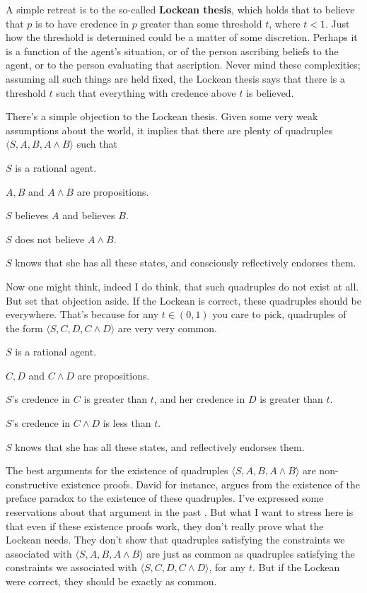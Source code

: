 A simple retreat is to the so-called \textbf{Lockean thesis}, which holds that to believe that $p$ is to have credence in $p$ greater than some threshold $t$, where $t < 1$. Just how the threshold is determined could be a matter of some discretion. Perhaps it is a function of the agent's situation, or of the person ascribing beliefs to the agent, or to the person evaluating that ascription. Never mind these complexities; assuming all such things are held fixed, the Lockean thesis says that there is a threshold $t$ such that everything with credence above $t$ is believed.

There's a simple objection to the Lockean thesis. Given some very weak assumptions about the world, it implies that there are plenty of quadruples $\langle S, A, B, A \wedge B \rangle$ such that

\begin{itemize*}
\item $S$ is a rational agent.
\item $A, B$ and $A \wedge B$ are propositions.
\item $S$ believes $A$ and believes $B$.
\item $S$ does not believe $A \wedge B$.
\item $S$ knows that she has all these states, and consciously reflectively endorses them.
\end{itemize*}

\noindent Now one might think, indeed I do think, that such quadruples do not exist at all. But set that objection aside. If the Lockean is correct, these quadruples should be everywhere. That's because for any $t \in (0, 1) $ you care to pick, quadruples of the form $\langle S, C, D, C \wedge D \rangle$ are very very common.

\begin{itemize*}
\item $S$ is a rational agent.
\item $C, D$ and $C \wedge D$ are propositions.
\item $S$'s credence in $C$ is greater than $t$, and her credence in $D$ is greater than $t$.
\item $S$'s credence in $C \wedge D$ is less than $t$.
\item $S$ knows that she has all these states, and reflectively endorses them.
\end{itemize*}

\noindent The best arguments for the existence of quadruples $\langle S, A, B, A \wedge B \rangle$  are non-con\-structive existence proofs. David \cite{Christensen2005} for instance, argues from the existence of the preface paradox to the existence of these quadruples. I've expressed some reservations about that argument in the past \citep{Weatherson2005-WEACWD}. But what I want to stress here is that even if these existence proofs work, they don't really prove what the Lockean needs. They don't show that quadruples satisfying the constraints we associated with $\langle S, A, B, A \wedge B \rangle$ are just as common as quadruples satisfying the constraints we associated with $\langle S, C, D, C \wedge D \rangle$, for any $t$. But if the Lockean were correct, they should be exactly as common.

